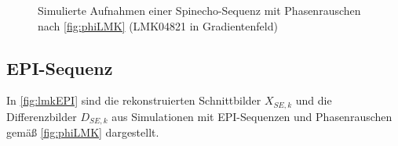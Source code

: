 \begin{figure}[H]
	\hfill
	\hfill
	\caption[LMK04821 Phasenrauschen (Spinecho-Sequenz)]{Simulierte Aufnahmen einer Spinecho-Sequenz mit Phasenrauschen nach \autoref{fig:phiLMK}  (LMK04821 in Gradientenfeld)}
	\label{fig:lmkSE}	
\end{figure}

\clearpage
\subsection{EPI-Sequenz}
In \autoref{fig:lmkEPI} sind die rekonstruierten Schnittbilder $X_{SE,k}$ und die Differenzbilder $D_{SE,k}$ aus Simulationen mit EPI-Sequenzen und Phasenrauschen gemäß \autoref{fig:phiLMK} dargestellt.


